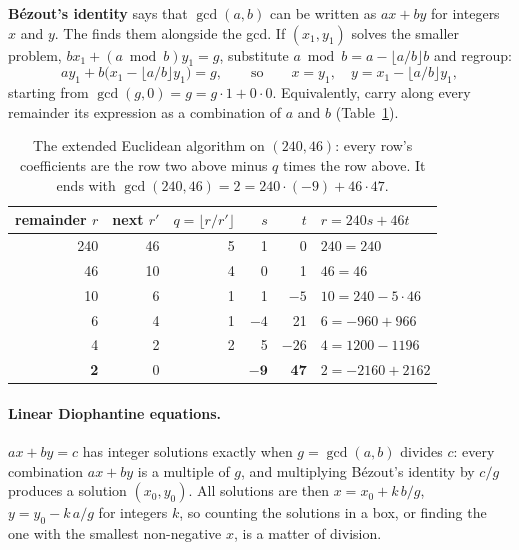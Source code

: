 \textbf{B\'ezout's identity} says that $\gcd(a, b)$ can be written as $ax + by$ for integers $x$ and $y$. The  finds them alongside the gcd. If $(x_1, y_1)$ solves the smaller problem, $b x_1 + (a \bmod b) y_1 = g$, substitute $a \bmod
b = a - \lfloor a/b \rfloor b$ and regroup:
\[
  a y_1 + b \bigl(x_1 - \lfloor a/b \rfloor y_1\bigr) = g, \qquad\text{so}\qquad x = y_1, \quad y = x_1 - \lfloor a/b \rfloor y_1,
\]
starting from $\gcd(g, 0) = g = g \cdot 1 + 0 \cdot 0$. Equivalently, carry along every remainder its expression as a combination of
$a$ and $b$ (Table~\ref{tab:extgcd}).

\begin{table}[htbp]
\centering\small
\begin{tabular}{@{}rrrrrl@{}}
\toprule
remainder $r$ & next $r'$ & $q = \lfloor r / r' \rfloor$ & $s$ & $t$ & $r = 240 s + 46 t$ \\
\midrule
240 & 46 & 5 & 1 & 0 & $240 = 240$ \\
46 & 10 & 4 & 0 & 1 & $46 = 46$ \\
10 & 6 & 1 & 1 & $-5$ & $10 = 240 - 5 \cdot 46$ \\
6 & 4 & 1 & $-4$ & 21 & $6 = -960 + 966$ \\
4 & 2 & 2 & 5 & $-26$ & $4 = 1200 - 1196$ \\
\textbf{2} & 0 & & $\mathbf{-9}$ & \textbf{47} & $2 = -2160 + 2162$ \\
\bottomrule
\end{tabular}
\caption{The extended Euclidean algorithm on $(240, 46)$: every row's coefficients are the row two above minus $q$ times the row
above. It ends with $\gcd(240, 46) = 2 = 240 \cdot (-9) + 46 \cdot 47$.}
\label{tab:extgcd}
\end{table}


\paragraph{Linear Diophantine equations.} $ax + by = c$ has integer solutions exactly when $g = \gcd(a, b)$ divides $c$: every
combination $ax + by$ is a multiple of $g$, and multiplying B\'ezout's identity by $c/g$ produces a solution $(x_0, y_0)$. All solutions
are then $x = x_0 + k\,b/g$, $y = y_0 - k\,a/g$ for integers $k$, so counting the solutions in a box, or finding the one with the
smallest non-negative $x$, is a matter of division.

